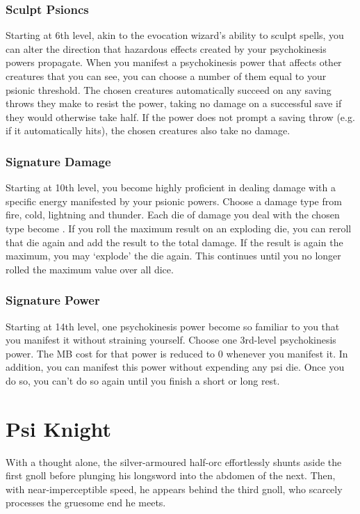 \subsubsection{Sculpt Psioncs}
Starting at 6th level,
akin to the evocation wizard's ability to sculpt spells,
you can alter the direction that hazardous effects
created by your psychokinesis powers propagate.
When you manifest a psychokinesis power that affects
other creatures that you can see,
you can choose a number of them equal to your
psionic threshold.
The chosen creatures automatically succeed on any saving
throws they make to resist the power,
taking no damage on a successful save if they would
otherwise take half.
If the power does not prompt a saving throw
(e.g. if it automatically hits),
the chosen creatures also take no damage.

\subsubsection{Signature Damage}
Starting at 10th level,
you become highly proficient in dealing damage
with a specific energy manifested by your psionic powers.
Choose a damage type from fire, cold, lightning and thunder.
Each die of damage you deal with the chosen type
become .
If you roll the maximum result on an exploding die,
you can reroll that die again and add the result to the
total damage.
If the result is again the maximum,
you may `explode' the die again.
This continues until you no
longer rolled the maximum value over all dice.

\subsubsection{Signature Power}
Starting at 14th level,
one psychokinesis power become so familiar to you that you
manifest it without straining yourself.
Choose one 3rd-level psychokinesis power.
The MB cost for that power is reduced to 0 whenever you manifest it.
In addition, you can manifest this power without expending
any psi die.
Once you do so,
you can't do so again until you finish a short or long rest.

\clearpage\section{Psi Knight}
\label{sec:psi_knight}
\DndSetThemeColor[DmgCoral]
With a thought alone, the silver-armoured half-orc effortlessly
shunts aside the first gnoll before plunging his longsword
into the abdomen of the next.
Then, with near-imperceptible speed, he appears behind the third gnoll,
who scarcely processes the gruesome end he meets.

